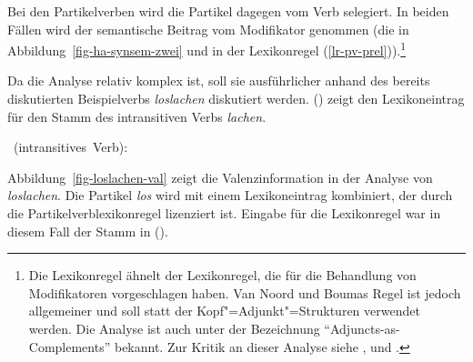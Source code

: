 Bei den Partikelverben wird die Partikel dagegen vom Verb selegiert. In beiden Fällen wird
der semantische Beitrag vom Modifikator genommen (die  in Abbildung~\ref{fig-ha-synsem-zwei}
und  in der Lexikonregel (\ref{lr-pv-prel})).\footnote{
  Die Lexikonregel ähnelt der Lexikonregel, die \citet{NB94} für die Behandlung von Modifikatoren
  vorgeschlagen haben. Van Noord und Boumas Regel ist jedoch allgemeiner und soll statt
  der Kopf"=Adjunkt"=Strukturen verwendet werden. Die Analyse ist auch unter der Bezeichnung
  "`Adjuncts-as-Complements"' bekannt. Zur Kritik an dieser Analyse siehe
  ,  und .%
}

Da die Analyse relativ komplex ist, soll sie ausführlicher anhand des bereits diskutierten
Beispielverbs \emph{loslachen} diskutiert werden. () zeigt den Lexikoneintrag
für den Stamm des intransitiven Verbs \emph{lachen}.

\eas
\label{le-lachen}
\mbox{ (intransitives Verb):}\\
\zs

\noindent
Abbildung~\vref{fig-loslachen-val} zeigt die Valenzinformation in der Analyse von \emph{loslachen}.
Die Partikel \emph{los} wird mit einem Lexikoneintrag kombiniert, der durch die
Partikelverblexikonregel lizenziert ist. Eingabe für die Lexikonregel
war in diesem Fall der Stamm  in ().

